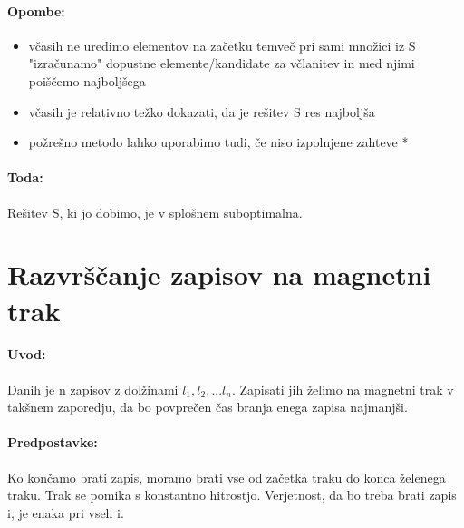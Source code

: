\documentclass[a4paper,10pt]{article}
\begin{document}
\paragraph{Opombe:}
\begin{itemize}
\item v\v casih ne uredimo elementov na za\v cetku temve\v c pri sami mno\v zici iz S "izra\v cunamo" dopustne elemente/kandidate za v\v clanitev in med njimi poi\v s\v cemo najbolj\v sega
\item v\v casih je relativno te\v zko dokazati, da je re\v sitev S res najbolj\v sa
\item po\v zre\v sno metodo lahko uporabimo tudi, \v ce niso izpolnjene zahteve *
\end{itemize}

\paragraph{Toda:}
Re\v sitev S, ki jo dobimo, je v splo\v snem suboptimalna.

\section{Razvr\v s\v canje zapisov na magnetni trak}

\paragraph{Uvod:}
Danih je n zapisov z dol\v zinami $l_1, l_2,... l_n$. Zapisati jih \v zelimo na magnetni trak v tak\v snem zaporedju, da bo povpre\v cen \v cas branja enega zapisa najmanj\v si.

\paragraph{Predpostavke:}
Ko kon\v camo brati zapis, moramo brati vse od za\v cetka traku do konca \v zelenega traku. 
Trak se pomika s konstantno hitrostjo. Verjetnost, da bo treba brati zapis i, je enaka pri vseh i.
\end{document}
